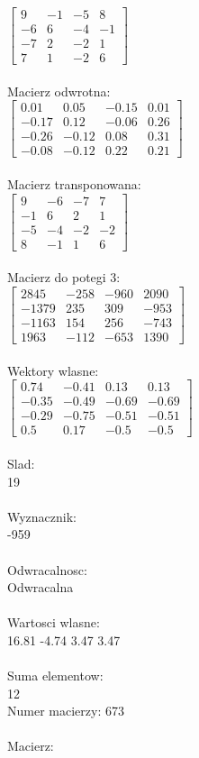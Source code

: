 \documentclass[a4paper,12pt]{article}
\begin{document}
$\begin{bmatrix} 9&-1&-5&8\\-6&6&-4&-1\\-7&2&-2&1\\7&1&-2&6 \end{bmatrix}$
\\
\\
Macierz odwrotna:\\

$\begin{bmatrix} 0.01&0.05&-0.15&0.01\\-0.17&0.12&-0.06&0.26\\-0.26&-0.12&0.08&0.31\\-0.08&-0.12&0.22&0.21 \end{bmatrix}$
\\
\\
Macierz transponowana:\\

$\begin{bmatrix} 9&-6&-7&7\\-1&6&2&1\\-5&-4&-2&-2\\8&-1&1&6 \end{bmatrix}$
\\
\\
Macierz do potegi 3:\\

$\begin{bmatrix} 2845&-258&-960&2090\\-1379&235&309&-953\\-1163&154&256&-743\\1963&-112&-653&1390 \end{bmatrix}$
\\
\\
Wektory wlasne:\\

$\begin{bmatrix} 0.74&-0.41&0.13&0.13\\-0.35&-0.49&-0.69&-0.69\\-0.29&-0.75&-0.51&-0.51\\0.5&0.17&-0.5&-0.5 \end{bmatrix}$
\\
\\
Slad:\\
19
\\
\\
Wyznacznik:\\
-959
\\
\\
Odwracalnosc:\\
Odwracalna
\\
\\
Wartosci wlasne:\\
16.81 -4.74 3.47 3.47
\\
\\
Suma elementow:\\
12
\\
\newpage
Numer macierzy:
673
\\
\\
Macierz:\\
\end{document}
